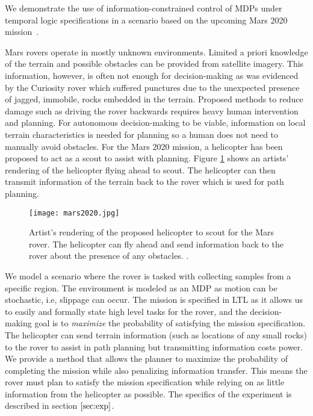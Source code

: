 We demonstrate the use of information-constrained control of MDPs under temporal logic specifications in a scenario based on the upcoming Mars 2020 mission~\cite{landau2015helicopter}. 

Mars rovers operate in mostly unknown environments. Limited a priori knowledge of the terrain and possible obstacles can be provided from satellite imagery. This information, however, is often not enough for decision-making as was evidenced by the Curiosity rover which suffered punctures due to the unexpected presence of jagged, immobile, rocks embedded in the terrain. Proposed methods to reduce damage such as driving the rover backwards requires heavy human intervention and planning. For autonomous decision-making to be viable, information on local terrain characteristics is needed for planning so a human does not need to manually avoid obstacles. For the Mars 2020 mission, a helicopter has been proposed to act as a scout \cite{landau2015helicopter} to assist with planning. Figure \ref{fig:mars2020} shows an artists' rendering of the helicopter flying ahead to scout. The helicopter can then transmit information of the terrain back to the rover which is used for path planning.

\begin{figure}
\centering
\texttt{[image: mars2020.jpg]}
\caption{Artist's rendering of the proposed helicopter to scout for the Mars rover. The helicopter can fly ahead and send information back to the rover about the presence of any obstacles. \cite{landau2015helicopter}.}\label{fig:mars2020}
\end{figure}

We model a scenario where the rover is tasked with collecting samples from a specific region. The environment is modeled as an MDP as motion can be stochastic, i.e, slippage can occur. The mission is specified in LTL as it allows us to easily and formally state high level tasks for the rover, and the decision-making goal is to \emph{maximize} the probability of satisfying the mission specification. The helicopter can send terrain information (such as locations of any small rocks) to the rover to assist in path planning but transmitting information costs power. We provide a method that allows the planner to maximize the probability of completing the mission while also penalizing information transfer. This means the rover must plan to satisfy the mission specification while relying on as little information from the helicopter as possible. The specifics of the experiment is described in section $\ref{sec:exp}$.